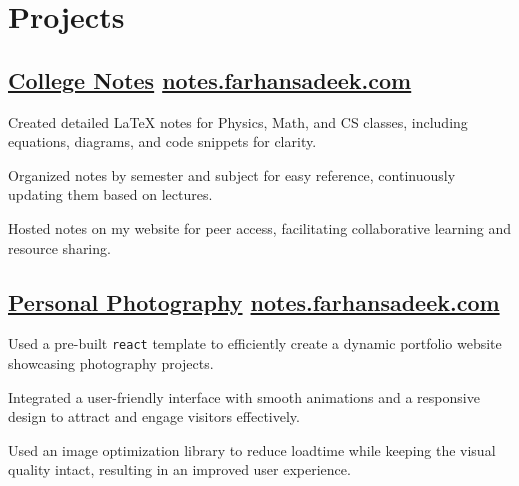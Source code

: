 \documentclass[]{Farhan_Resume_Class}
\begin{document}
\begin{minipage}[t]{0.70\textwidth}
    \section{Projects}
\subsection{\href{https://notes.farhansadeek.com}{College Notes} \hfill \href{https://notes.farhansadeek.com}{\lowercase{notes.farhansadeek.com}}}
        \begin{tightemize}
            \vspace{10pt}
            \item Created detailed LaTeX notes for Physics, Math, and CS classes, including equations, diagrams, and code snippets for clarity.
            \item Organized notes by semester and subject for easy reference, continuously updating them based on lectures.
            \item Hosted notes on my website for peer access, facilitating collaborative learning and resource sharing.
        \end{tightemize}                                                                           
\subsection{\href{https://photos.farhansadeek.com}{Personal Photography} \hfill \href{https://notes.farhansadeek.com}{\lowercase{notes.farhansadeek.com}}}
    \begin{tightemize}
        \vspace{10pt}
        \item Used a pre-built \texttt{react} template to efficiently create a dynamic portfolio website showcasing photography projects. 
\item Integrated a user-friendly interface with smooth animations and a responsive design to attract and engage visitors effectively. 
\item Used an image optimization library to reduce loadtime while keeping the visual quality intact, resulting in an improved user experience. 
    \end{tightemize}


\end{minipage}
\end{document}
